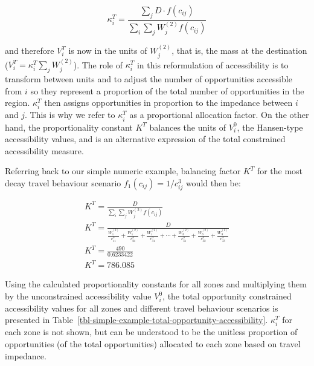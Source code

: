 \documentclass[
]{article}
\begin{document}
\[
\kappa_i^T = \frac{\sum_j D\cdot f(c_{ij})}{\sum_i\sum_j W^{(2)}_jf(c_{ij})}
\]

\noindent and therefore \(V^T_i\) is now in the units of \(W^{(2)}_j\),
that is, the mass at the destination
(\(V^T_i = \kappa_i^T\sum_j W^{(2)}_j\)). The role of \(\kappa_i^T\) in
this reformulation of accessibility is to transform between units and to
adjust the number of opportunities accessible from \(i\) so they
represent a proportion of the total number of opportunities in the
region. \(\kappa_i^T\) then assigns opportunities in proportion to the
impedance between \(i\) and \(j\). This is why we refer to
\(\kappa_i^T\) as a proportional allocation factor. On the other hand,
the proportionality constant \(K^T\) balances the units of \(V^0_i\),
the Hansen-type accessibility values, and is an alternative expression
of the total constrained accessibility measure.

Referring back to our simple numeric example, balancing factor \(K^T\)
for the most decay travel behaviour scenario
\(f_1(c_{ij}) = 1/c_{ij}^3\) would then be:

\[
\begin{array}{l}
K^T = \frac{D}{\sum_{i}\sum_{j} W_j^{(2)} f(c_{ij})}\\
K^T = \frac{D}{\frac{W_1^{(2)}}{c_{11}^3}+\frac{W_1^{(2)}}{c_{21}^3} + \frac{W_1^{(2)}}{c_{31}^3} + \cdots + \frac{W_3^{(2)}}{c_{31}^3} + \frac{W_3^{(2)}}{c_{32}^3} + \frac{W_3^{(2)}}{c_{33}^3}
}\\
K^T = \frac{490}{0.6233422} \\
K^T = 786.085
\end{array}
\]

Using the calculated proportionality constants for all zones and
multiplying them by the unconstrained accessibility value \(V^0_i\), the
total opportunity constrained accessibility values for all zones and
different travel behaviour scenarios is presented in
Table~\ref{tbl-simple-example-total-opportunity-accessibility}.
\(\kappa_i^T\) for each zone is not shown, but can be understood to be
the unitless proportion of opportunities (of the total opportunities)
allocated to each zone based on travel impedance.
\end{document}
